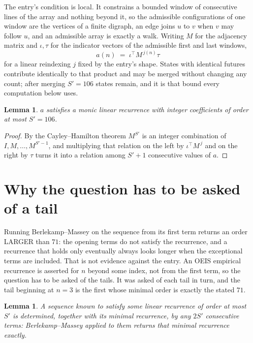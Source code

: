 \documentclass[11pt,a4paper]{article}
\theoremstyle{plain}
\newtheorem{lemma}[theorem]{Lemma}
\theoremstyle{definition}
\begin{document}
The entry's condition is local. It constrains a bounded window of consecutive lines of the
array and nothing beyond it, so the admissible configurations of one window are the vertices of
a finite digraph, an edge joins $u$ to $v$ when $v$ may follow $u$, and an admissible array is
exactly a walk. Writing $M$ for the adjacency matrix and $\iota,\tau$ for the indicator vectors
of the admissible first and last windows,
\[
a(n)\;=\;\iota^{\!\top}M^{\,j(n)}\tau
\]
for a linear reindexing $j$ fixed by the entry's shape. States with identical futures
contribute identically to that product and may be merged without changing any count; after
merging $S'=106$ states remain, and it is that bound every computation below uses.

\begin{lemma}\label{lem:cf}
$a$ satisfies a monic linear recurrence with integer coefficients of order at most $S'=106$.
\end{lemma}

\begin{proof}
By the Cayley--Hamilton theorem $M^{S'}$ is an integer combination of $I,M,\dots,M^{S'-1}$,
and multiplying that relation on the left by $\iota^{\!\top}M^{\,j}$ and on the right by
$\tau$ turns it into a relation among $S'+1$ consecutive values of $a$.
\end{proof}

\section{Why the question has to be asked of a tail}

Running Berlekamp--Massey on the sequence from its first term returns an order LARGER than $71$: the opening terms do not satisfy the recurrence, and a recurrence that holds only eventually always looks longer when the exceptional terms are included. That is not evidence against the entry. An OEIS empirical recurrence is asserted for $n$ beyond some index, not from the first term, so the question has to be asked of the tails. It was asked of each tail in turn, and the tail beginning at $n=3$ is the first whose minimal order is exactly the stated $71$.

\begin{lemma}\label{lem:bm}
A sequence known to satisfy some linear recurrence of order at most $S'$ is determined,
together with its minimal recurrence, by any $2S'$ consecutive terms: Berlekamp--Massey applied
to them returns that minimal recurrence exactly.
\end{lemma}
\end{document}
